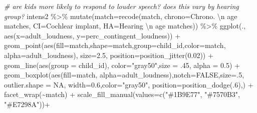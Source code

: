 \documentclass[
]{article}
\newenvironment{Shaded}{\begin{snugshade}}{\end{snugshade}}
\newcommand{\AttributeTok}[1]{\textcolor[rgb]{0.77,0.63,0.00}{#1}}
\newcommand{\CommentTok}[1]{\textcolor[rgb]{0.56,0.35,0.01}{\textit{#1}}}
\newcommand{\ConstantTok}[1]{\textcolor[rgb]{0.00,0.00,0.00}{#1}}
\newcommand{\DecValTok}[1]{\textcolor[rgb]{0.00,0.00,0.81}{#1}}
\newcommand{\FloatTok}[1]{\textcolor[rgb]{0.00,0.00,0.81}{#1}}
\newcommand{\FunctionTok}[1]{\textcolor[rgb]{0.00,0.00,0.00}{#1}}
\newcommand{\NormalTok}[1]{#1}
\newcommand{\SpecialCharTok}[1]{\textcolor[rgb]{0.00,0.00,0.00}{#1}}
\newcommand{\StringTok}[1]{\textcolor[rgb]{0.31,0.60,0.02}{#1}}
\begin{document}
\begin{Shaded}
\begin{Highlighting}[]
\CommentTok{\# are kids more likely to respond to louder speech? does this vary by hearing group?}
\NormalTok{intens2 }\SpecialCharTok{\%\textgreater{}\%}
    \FunctionTok{mutate}\NormalTok{(}\AttributeTok{match=}\FunctionTok{recode}\NormalTok{(match,}
                      \AttributeTok{chrono=}\StringTok{\textquotesingle{}Chrono. }\SpecialCharTok{\textbackslash{}n}\StringTok{ age matches\textquotesingle{}}\NormalTok{,}
                      \AttributeTok{CI=}\StringTok{\textquotesingle{}Cochlear implant\textquotesingle{}}\NormalTok{,}
                      \AttributeTok{HA=}\StringTok{\textquotesingle{}Hearing }\SpecialCharTok{\textbackslash{}n}\StringTok{ age matches\textquotesingle{}}\NormalTok{)) }\SpecialCharTok{\%\textgreater{}\%}
\FunctionTok{ggplot}\NormalTok{(., }\FunctionTok{aes}\NormalTok{(}\AttributeTok{x=}\NormalTok{adult\_loudness, }\AttributeTok{y=}\NormalTok{perc\_contingent\_loudness)) }\SpecialCharTok{+} 
    \FunctionTok{geom\_point}\NormalTok{(}\FunctionTok{aes}\NormalTok{(}\AttributeTok{fill=}\NormalTok{match,}\AttributeTok{shape=}\NormalTok{match,}\AttributeTok{group=}\NormalTok{child\_id,}\AttributeTok{color=}\NormalTok{match, }\AttributeTok{alpha=}\NormalTok{adult\_loudness),}
                \AttributeTok{size=}\FloatTok{2.5}\NormalTok{, }\AttributeTok{position=}\FunctionTok{position\_jitter}\NormalTok{(}\FloatTok{0.02}\NormalTok{)) }\SpecialCharTok{+} 
    \FunctionTok{geom\_line}\NormalTok{(}\FunctionTok{aes}\NormalTok{(}\AttributeTok{group =}\NormalTok{ child\_id), }\AttributeTok{color=}\StringTok{"gray50"}\NormalTok{,}\AttributeTok{size =}\NormalTok{ .}\DecValTok{45}\NormalTok{, }\AttributeTok{alpha =} \FloatTok{0.5}\NormalTok{) }\SpecialCharTok{+} 
    \FunctionTok{geom\_boxplot}\NormalTok{(}\FunctionTok{aes}\NormalTok{(}\AttributeTok{fill=}\NormalTok{match, }\AttributeTok{alpha=}\NormalTok{adult\_loudness),}\AttributeTok{notch=}\ConstantTok{FALSE}\NormalTok{,}\AttributeTok{size=}\NormalTok{.}\DecValTok{5}\NormalTok{, }\AttributeTok{outlier.shape =} \ConstantTok{NA}\NormalTok{,}
                 \AttributeTok{width=}\FloatTok{0.6}\NormalTok{,}\AttributeTok{color=}\StringTok{"gray50"}\NormalTok{, }\AttributeTok{position=}\FunctionTok{position\_dodge}\NormalTok{(.}\DecValTok{6}\NormalTok{),) }\SpecialCharTok{+}
    \FunctionTok{facet\_wrap}\NormalTok{(}\SpecialCharTok{\textasciitilde{}}\NormalTok{match) }\SpecialCharTok{+}
   \FunctionTok{scale\_fill\_manual}\NormalTok{(}\AttributeTok{values=}\FunctionTok{c}\NormalTok{(}\StringTok{"\#1B9E77"}\NormalTok{, }\StringTok{"\#7570B3"}\NormalTok{, }\StringTok{"\#E7298A"}\NormalTok{))}\SpecialCharTok{+}

\end{Highlighting}
\end{Shaded}
\end{document}
